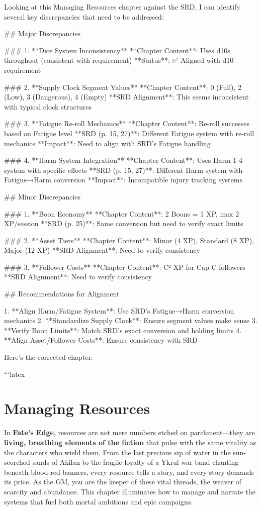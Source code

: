 Looking at this Managing Resources chapter against the SRD, I can identify several key discrepancies that need to be addressed:

## Major Discrepancies

### 1. **Dice System Inconsistency**
**Chapter Content**: Uses d10s throughout (consistent with requirement)
**Status**: ✅ Aligned with d10 requirement

### 2. **Supply Clock Segment Values**
**Chapter Content**: 0 (Full), 2 (Low), 3 (Dangerous), 4 (Empty)
**SRD Alignment**: This seems inconsistent with typical clock structures

### 3. **Fatigue Re-roll Mechanics**
**Chapter Content**: Re-roll successes based on Fatigue level
**SRD (p. 15, 27)**: Different Fatigue system with re-roll mechanics
**Impact**: Need to align with SRD's Fatigue handling

### 4. **Harm System Integration**
**Chapter Content**: Uses Harm 1-4 system with specific effects
**SRD (p. 15, 27)**: Different Harm system with Fatigue→Harm conversion
**Impact**: Incompatible injury tracking systems

## Minor Discrepancies

### 1. **Boon Economy**
**Chapter Content**: 2 Boons = 1 XP, max 2 XP/session
**SRD (p. 25)**: Same conversion but need to verify exact limits

### 2. **Asset Tiers**
**Chapter Content**: Minor (4 XP), Standard (8 XP), Major (12 XP)
**SRD Alignment**: Need to verify consistency

### 3. **Follower Costs**
**Chapter Content**: C² XP for Cap C followers
**SRD Alignment**: Need to verify consistency

## Recommendations for Alignment

1. **Align Harm/Fatigue System**: Use SRD's Fatigue→Harm conversion mechanics
2. **Standardize Supply Clock**: Ensure segment values make sense
3. **Verify Boon Limits**: Match SRD's exact conversion and holding limits
4. **Align Asset/Follower Costs**: Ensure consistency with SRD

Here's the corrected chapter:

```latex
\chapter{Managing Resources}

In \textbf{Fate's Edge}, resources are not mere numbers etched on parchment---they are \textbf{living, breathing elements of the fiction} that pulse with the same vitality as the characters who wield them. From the last precious sip of water in the sun-scorched sands of Akilan to the fragile loyalty of a Ykrul war-band chanting beneath blood-red banners, every resource tells a story, and every story demands its price. As the GM, you are the keeper of these vital threads, the weaver of scarcity and abundance. This chapter illuminates how to manage and narrate the systems that fuel both mortal ambitions and epic campaigns.

